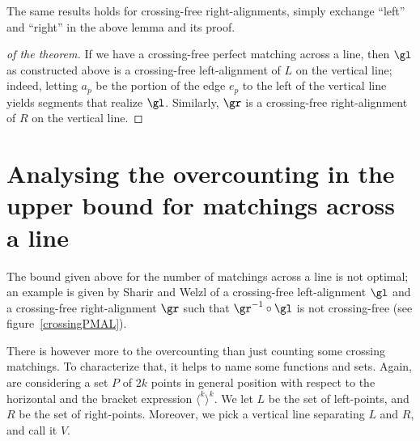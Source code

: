 \documentclass[10pt, a4paper, twoside]{basestyle}
\begin{document}
The same results holds for crossing-free right-alignments, simply exchange ``left'' and ``right'' in the above
lemma and its proof.

\begin{proof}[of the theorem]
If we have a crossing-free perfect matching across a line, then $\gl$ as constructed above is a crossing-free
left-alignment of $L$ on the vertical line; indeed, letting $a_p$ be the portion of the edge $e_p$
to the left of the vertical line yields segments that realize $\gl$.
Similarly, $\gr$ is a crossing-free right-alignment of $R$ on the vertical line.
\end{proof}
\section{Analysing the overcounting in the upper bound for matchings across a line}
The bound given above for the number of matchings across a line is not optimal;
an example is given by Sharir and Welzl of a crossing-free left-alignment $\gl$ and a crossing-free
right-alignment $\gr$ such that $\gr^{-1}\Compose \gl$ is not crossing-free (see figure~\ref{crossingPMAL}).

There is however more to the overcounting than just counting some crossing matchings.
To characterize that, it helps to name some functions and sets. Again, are considering a
set $P$ of $2k$ points in general position with respect to the horizontal and the bracket
expression $\langle^k\rangle^k$.  We let $L$ be the set of left-points, and $R$ be the
set of right-points. Moreover, we pick a vertical line separating $L$ and $R$, and call it
$V$.
\end{document}
